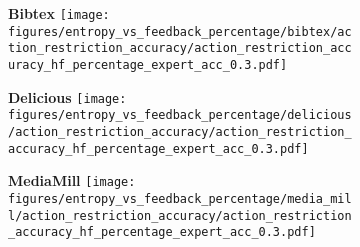\captionsetup{font=footnotesize}
\begin{figure}[t]
     \caption{Variation of expert queries made for different models based on entropy for feedback type: Action Recommendation}
    \label{fig:app_var_entr_percentage_ar}
    \centering
    \begin{subfigure}[b]{0.32\columnwidth}
        \centering
        \setlength{\fboxsep}{1pt}\colorbox{lightgray!30}{\textbf{Bibtex}}
        \texttt{[image: figures/entropy\_vs\_feedback\_percentage/bibtex/action\_restriction\_accuracy/action\_restriction\_accuracy\_hf\_percentage\_expert\_acc\_0.3.pdf]}
    \end{subfigure}
    \hfill
    \begin{subfigure}[b]{0.32\columnwidth}
        \centering
        \setlength{\fboxsep}{1pt}\colorbox{lightgray!30}{\textbf{Delicious}}
        \texttt{[image: figures/entropy\_vs\_feedback\_percentage/delicious/action\_restriction\_accuracy/action\_restriction\_accuracy\_hf\_percentage\_expert\_acc\_0.3.pdf]}
    \end{subfigure}
    \hfill
    \begin{subfigure}[b]{0.32\columnwidth}
        \centering
        \setlength{\fboxsep}{1pt}\colorbox{lightgray!30}{\textbf{MediaMill}}
        \texttt{[image: figures/entropy\_vs\_feedback\_percentage/media\_mill/action\_restriction\_accuracy/action\_restriction\_accuracy\_hf\_percentage\_expert\_acc\_0.3.pdf]}
    \end{subfigure}
    \hfill
    

\end{figure}
